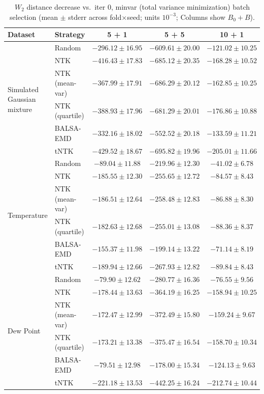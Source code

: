\begin{table}[ht]
\centering
\small
\caption{$W_2$ distance decrease vs.\ iter 0, minvar (total variance minimization) batch selection (mean $\pm$ stderr across fold$\times$seed; units $10^{-3}$; Columns show $B_0 + B$).}
\label{tab:quantile_minvar_w2_dec_v3}
\begin{tabular}{llccc}
\toprule
Dataset & Strategy & 5 + 1 & 5 + 5 & 10 + 1 \\
\midrule
\multirow{6}{*}{Simulated Gaussian mixture} & Random & $-296.12 \pm 16.95$ & $-609.61 \pm 20.00$ & $-121.02 \pm 10.25$ \\
 & NTK & $-416.43 \pm 17.83$ & $-685.12 \pm 20.35$ & $-168.28 \pm 10.52$ \\
 & NTK (mean-var) & $-367.99 \pm 17.91$ & $-686.29 \pm 20.12$ & $-162.85 \pm 10.25$ \\
 & NTK (quartile) & $-388.93 \pm 17.96$ & $-681.29 \pm 20.01$ & $-176.86 \pm 10.88$ \\
 & BALSA-EMD & $-332.16 \pm 18.02$ & $-552.52 \pm 20.18$ & $-133.59 \pm 11.21$ \\
 & tNTK & $\mathbf{-429.52 \pm 18.67}$ & $\mathbf{-695.82 \pm 19.96}$ & $\mathbf{-205.01 \pm 11.66}$ \\
\midrule
\multirow{6}{*}{Temperature} & Random & $-89.04 \pm 11.88$ & $-219.96 \pm 12.30$ & $-41.02 \pm 6.78$ \\
 & NTK & $-185.55 \pm 12.30$ & $-255.65 \pm 12.72$ & $-84.57 \pm 8.43$ \\
 & NTK (mean-var) & $-186.51 \pm 12.64$ & $-258.48 \pm 12.83$ & $-86.88 \pm 8.30$ \\
 & NTK (quartile) & $-182.63 \pm 12.68$ & $-255.01 \pm 13.08$ & $-88.36 \pm 8.37$ \\
 & BALSA-EMD & $-155.37 \pm 11.98$ & $-199.14 \pm 13.22$ & $-71.14 \pm 8.19$ \\
 & tNTK & $\mathbf{-189.94 \pm 12.66}$ & $\mathbf{-267.93 \pm 12.82}$ & $\mathbf{-89.84 \pm 8.43}$ \\
\midrule
\multirow{6}{*}{Dew Point} & Random & $-79.90 \pm 12.62$ & $-280.77 \pm 16.36$ & $-76.55 \pm 9.56$ \\
 & NTK & $-178.44 \pm 13.63$ & $-364.19 \pm 16.25$ & $-158.94 \pm 10.25$ \\
 & NTK (mean-var) & $-172.47 \pm 12.99$ & $-372.49 \pm 15.80$ & $-159.24 \pm 9.67$ \\
 & NTK (quartile) & $-173.21 \pm 13.38$ & $-375.47 \pm 16.54$ & $-158.70 \pm 10.34$ \\
 & BALSA-EMD & $-79.51 \pm 12.98$ & $-178.00 \pm 15.34$ & $-124.13 \pm 9.63$ \\
 & tNTK & $\mathbf{-221.18 \pm 13.53}$ & $\mathbf{-442.25 \pm 16.24}$ & $\mathbf{-212.74 \pm 10.44}$ \\
\bottomrule
\end{tabular}
\end{table}

